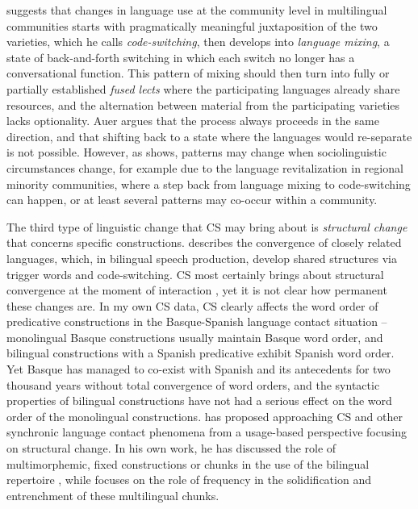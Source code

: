 \documentclass[output=paper]{langscibook}
\begin{document}
\textcite{auer1999codeswitching} suggests that changes in language use at the community level in multilingual communities starts with pragmatically meaningful juxtaposition of the two varieties, which he calls \textit{code-switching}, then develops into \textit{language mixing}, a state of back-and-forth switching in which each switch no longer has a conversational function. This pattern of mixing should then turn into fully or partially established \textit{fused lects} where the participating languages already share resources, and the alternation between material from the participating varieties lacks optionality. Auer argues that the process always proceeds in the same direction, and that shifting back to a state where the languages would re-separate is not possible. However, as \textcite{smith2016regression} shows, patterns may change when sociolinguistic circumstances change, for example due to the language revitalization in regional minority communities, where a step back from language mixing to code-switching can happen, or at least several patterns may co-occur within a community. 

The third type of linguistic change that CS may bring about is \textit{structural change} that concerns specific constructions. \textcite{clyne1967transference,clyne2003dynamics} describes the convergence of closely related languages, which, in bilingual speech production, develop shared structures via trigger words and code-switching. CS most certainly brings about structural convergence at the moment of interaction \parencite{frick2013emergent,riionheimo2014emergence}, yet it is not clear how permanent these changes are. In my own CS data, CS clearly affects the word order of predicative constructions in the Basque-Spanish language contact situation – monolingual Basque constructions usually maintain Basque word order, and bilingual constructions with a Spanish predicative exhibit Spanish word order. Yet Basque has managed to co-exist with Spanish and its antecedents for two thousand years without total convergence of word orders, and the syntactic properties of bilingual constructions have not had a serious effect on the word order of the monolingual constructions.  \textcite{backus2015usage} has proposed approaching CS and other synchronic language contact phenomena from a usage-based perspective focusing on structural change. In his own work, he has discussed the role of multimorphemic, fixed constructions or chunks in the use of the bilingual repertoire \parencite{backus2003units}, while \textcite{hakimov2016plural} focuses on the role of frequency in the solidification and entrenchment of these multilingual chunks. 
\end{document}
